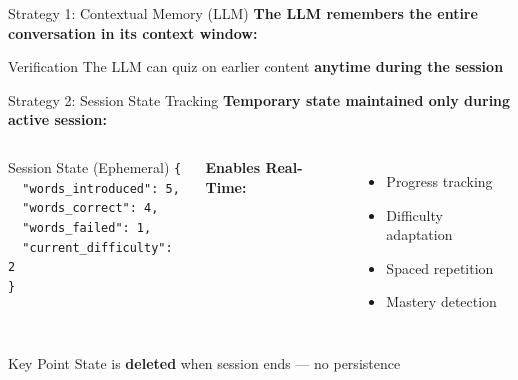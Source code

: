 \documentclass[aspectratio=169]{beamer}
\begin{document}
\begin{frame}{Strategy 1: Contextual Memory (LLM)}
\textbf{The LLM remembers the entire conversation in its context window:}

\vspace{0.3cm}

\begin{center}
\end{center}

\vspace{0.3cm}

\begin{block}{Verification}
The LLM can quiz on earlier content \textbf{anytime during the session}
\end{block}
\end{frame}

\begin{frame}{Strategy 2: Session State Tracking}
\textbf{Temporary state maintained only during active session:}

\vspace{0.3cm}

\begin{columns}[T]
\begin{block}{Session State (Ephemeral)}
\footnotesize
\texttt{\{}\\
\texttt{~~"words\_introduced": 5,}\\
\texttt{~~"words\_correct": 4,}\\
\texttt{~~"words\_failed": 1,}\\
\texttt{~~"current\_difficulty": 2}\\
\texttt{\}}
\end{block}

\textbf{Enables Real-Time:}
\begin{itemize}
    \item Progress tracking
    \item Difficulty adaptation
    \item Spaced repetition
    \item Mastery detection
\end{itemize}
\end{columns}

\vspace{0.3cm}

\begin{alertblock}{Key Point}
State is \textbf{deleted} when session ends — no persistence
\end{alertblock}
\end{frame}
\end{document}
